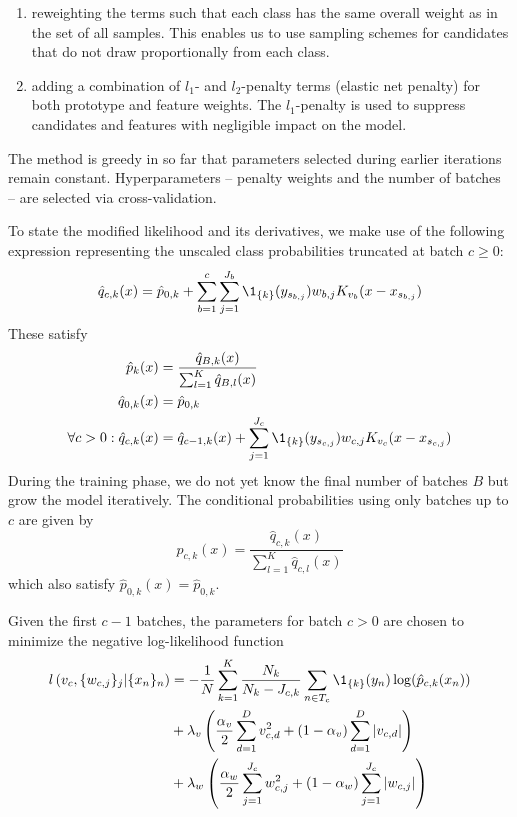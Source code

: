 \begin{enumerate}
\item reweighting the terms such that each class has the same overall weight as in the set of all samples.
This enables us to use sampling schemes for candidates that do not draw proportionally from each class.
%
\item adding a combination of $l_1$- and $l_2$-penalty terms (elastic net penalty) for both prototype and feature weights.
The $l_1$-penalty is used to suppress candidates and features with negligible impact on the model.
\end{enumerate}
%
The method is greedy in so far that parameters selected during earlier iterations remain constant.
Hyperparameters -- penalty weights and the number of batches -- are selected via cross-validation.\par
%
To state the modified likelihood and its derivatives, we make use of the following expression representing the unscaled class probabilities truncated at batch $c\geq0$:
%
\begin{equation}
\hat{q}_{c,k}(x)=\hat{p}_{0,k}
+\sum_{b=1}^c\sum_{j=1}^{J_b}\1_{\{k\}}(y_{s_{b,j}})w_{b,j}K_{v_b}(x-x_{s_{b,j}})
\label{eq_qckx}
\end{equation}
%
These satisfy
%
\begin{align}
\hat{p}_{k}(x)&=\frac{\hat{q}_{B,k}(x)}{\sum_{l=1}^K\hat{q}_{B,l}(x)}\label{eq_q_properties}\\
\hat{q}_{0,k}(x)&=\hat{p}_{0,k}\notag\\
\forall c>0:\hat{q}_{c,k}(x)&
=\hat{q}_{c-1,k}(x)+\sum_{j=1}^{J_c}\1_{\{k\}}(y_{s_{c,j}})w_{c,j}K_{v_c}(x-x_{s_{c,j}})
\notag
\end{align}
%
During the training phase, we do not yet know the final number of batches $B$ but grow the model iteratively.
The conditional probabilities using only batches up to $c$ are given by
%
\begin{equation}
\hat{p}_{c,k}(x)=\frac{\hat{q}_{c,k}(x)}{\sum_{l=1}^K\hat{q}_{c,l}(x)}\label{eq_pckx}
\end{equation}
%
which also satisfy $\hat{p}_{0,k}(x)=\hat{p}_{0,k}$.\par
%
Given the first $c-1$ batches, the parameters for batch $c>0$ are chosen to minimize the negative log-likelihood function
%
\begin{align}
l\left(v_c,\{w_{c,j}\}_j|\{x_n\}_n\right)
&=-\frac{1}{N}\sum_{k=1}^K\frac{N_k}{N_k-J_{c,k}}\sum_{n\in T_c}
\1_{\{k\}}(y_n)\log(\hat{p}_{c,k}(x_n))\label{eq_log_likelihood}\\
&+\lambda_v\left(\frac{\alpha_v}{2}\sum_{d=1}^Dv_{c,d}^2
+(1-\alpha_v)\sum_{d=1}^D|v_{c,d}|\right)\notag\\
&+\lambda_w\left(\frac{\alpha_w}{2}\sum_{j=1}^{J_c}w_{c,j}^2
+(1-\alpha_w)\sum_{j=1}^{J_c}|w_{c,j}|\right)\notag
\end{align}
